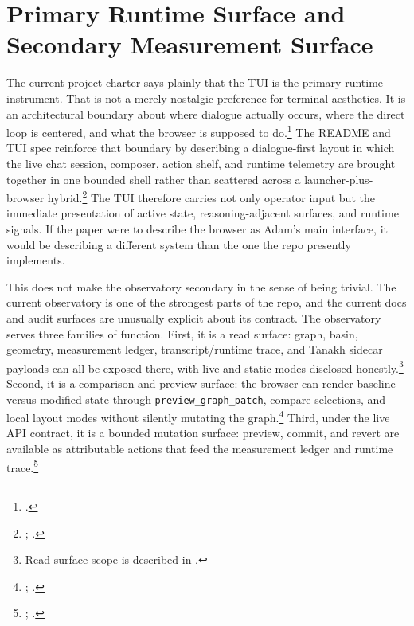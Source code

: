 \documentclass[10pt]{article}
\begin{document}
\section{Primary Runtime Surface and Secondary Measurement Surface}

The current project charter says plainly that the TUI is the primary runtime instrument. That is not a merely nostalgic preference for terminal aesthetics. It is an architectural boundary about where dialogue actually occurs, where the direct loop is centered, and what the browser is supposed to do.\footnote{.} The README and TUI spec reinforce that boundary by describing a dialogue-first layout in which the live chat session, composer, action shelf, and runtime telemetry are brought together in one bounded shell rather than scattered across a launcher-plus-browser hybrid.\footnote{; .} The TUI therefore carries not only operator input but the immediate presentation of active state, reasoning-adjacent surfaces, and runtime signals. If the paper were to describe the browser as Adam's main interface, it would be describing a different system than the one the repo presently implements.

This does not make the observatory secondary in the sense of being trivial. The current observatory is one of the strongest parts of the repo, and the current docs and audit surfaces are unusually explicit about its contract. The observatory serves three families of function. First, it is a read surface: graph, basin, geometry, measurement ledger, transcript/runtime trace, and Tanakh sidecar payloads can all be exposed there, with live and static modes disclosed honestly.\footnote{Read-surface scope is described in .} Second, it is a comparison and preview surface: the browser can render baseline versus modified state through \texttt{preview\_graph\_patch}, compare selections, and local layout modes without silently mutating the graph.\footnote{; .} Third, under the live API contract, it is a bounded mutation surface: preview, commit, and revert are available as attributable actions that feed the measurement ledger and runtime trace.\footnote{; .}
\end{document}
